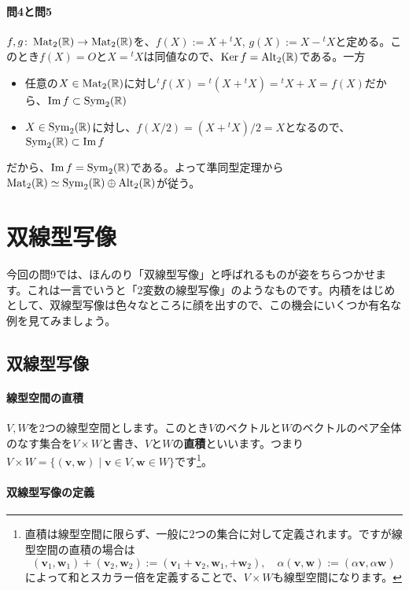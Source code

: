 \paragraph{問4と問5}
$f, g\colon \operatorname{Mat}_2(\mathbb{R}) \rightarrow \operatorname{Mat}_2(\mathbb{R})$を、$f(X) := X + {}^t X$, $g(X) := X - {}^t X$と定める。このとき$f(X) = O$と$X = {}^t X$は同値なので、$\operatorname{Ker} f = \operatorname{Alt}_2(\mathbb{R})$である。一方
\begin{itemize}
\item 任意の$X \in \operatorname{Mat}_2(\mathbb{R})$に対し${}^t f(X) = {}^t(X + {}^t X) = {}^t X + X = f(X)$だから、$\mathrm{Im}\, f \subset \operatorname{Sym}_2(\mathbb{R})$
\item $X \in \operatorname{Sym}_2(\mathbb{R})$に対し、$f(X/2) = (X + {}^t X)/2 = X$となるので、$\operatorname{Sym}_2(\mathbb{R}) \subset \mathrm{Im}\, f$
\end{itemize}
だから、$\mathrm{Im}\, f = \operatorname{Sym}_2(\mathbb{R})$である。よって準同型定理から$\operatorname{Mat}_2(\mathbb{R}) \simeq \operatorname{Sym}_2(\mathbb{R}) \oplus \operatorname{Alt}_2(\mathbb{R})$が従う。

\section{双線型写像}

今回の問9では、ほんのり「双線型写像」と呼ばれるものが姿をちらつかせます。これは一言でいうと「$2$変数の線型写像」のようなものです。内積をはじめとして、双線型写像は色々なところに顔を出すので、この機会にいくつか有名な例を見てみましょう。

\subsection{双線型写像}

\paragraph{線型空間の直積} $V, W$を$2$つの線型空間とします。このとき$V$のベクトルと$W$のベクトルのペア全体のなす集合を$V \times W$と書き、$V$と$W$の\textbf{直積}といいます。つまり$V\times W = \{(\bm{v}, \bm{w})\mid \bm{v} \in V, \bm{w} \in W\}$です\footnote{直積は線型空間に限らず、一般に$2$つの集合に対して定義されます。ですが線型空間の直積の場合は
\[
(\bm{v}_1, \bm{w}_1) + (\bm{v}_2, \bm{w}_2) := (\bm{v}_1 + \bm{v}_2, \bm{w}_1, + \bm{w}_2), \quad
\alpha(\bm{v}, \bm{w}) := (\alpha\bm{v}, \alpha\bm{w})
\]
によって和とスカラー倍を定義することで、$V\times W$も線型空間になります。}。

\paragraph{双線型写像の定義}

